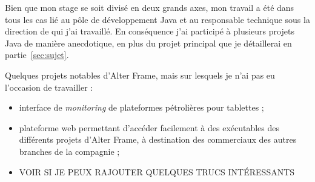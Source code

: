Bien que mon stage se soit divisé en deux grands axes, mon travail a été dans tous les cas lié au pôle de développement Java et au responsable technique sous la direction de qui j'ai travaillé. En conséquence j'ai participé à plusieurs projets Java de manière anecdotique, en plus du projet principal que je détaillerai en partie~\ref{sec:sujet}.

Quelques projets notables d'Alter Frame, mais sur lesquels je n'ai pas eu l'occasion de travailler :
\begin{itemize}[label=$\bullet$]
  \item interface de \textit{monitoring} de plateformes pétrolières pour tablettes ;
  \item plateforme web permettant d'accéder facilement à des exécutables des différents projets d'Alter Frame, à destination des commerciaux des autres branches de la compagnie ;
  \item VOIR SI JE PEUX RAJOUTER QUELQUES TRUCS INTÉRESSANTS
\end{itemize}